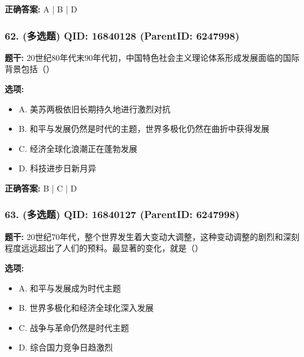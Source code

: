 \documentclass[12pt,UTF8]{ctexart}
\begin{document}
\textbf{正确答案:}
A | B | D

\vspace{0.3em}\hrulefill\vspace{0.7em}

\subsubsection*{62. (多选题) \small QID: 16840128 (ParentID: 6247998)}

\textbf{题干:}
20世纪80年代末90年代初，中国特色社会主义理论体系形成发展面临的国际背景包括（）



\textbf{选项:}
\begin{itemize}[leftmargin=*]

  \item A. 美苏两极依旧长期持久地进行激烈对抗

  \item B. 和平与发展仍然是时代的主题，世界多极化仍然在曲折中获得发展

  \item C. 经济全球化浪潮正在蓬勃发展

  \item D. 科技进步日新月异

\end{itemize}

\textbf{正确答案:}
B | C | D

\vspace{0.3em}\hrulefill\vspace{0.7em}

\subsubsection*{63. (多选题) \small QID: 16840127 (ParentID: 6247998)}

\textbf{题干:}
20世纪70年代，整个世界发生着大变动大调整，这种变动调整的剧烈和深刻程度远远超出了人们的预料。最显著的变化，就是（）



\textbf{选项:}
\begin{itemize}[leftmargin=*]

  \item A. 和平与发展成为时代主题

  \item B. 世界多极化和经济全球化深入发展

  \item C. 战争与革命仍然是时代主题

  \item D. 综合国力竞争日趋激烈

\end{itemize}
\end{document}
